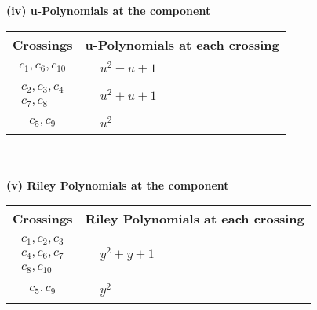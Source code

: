 \documentclass[1p]{elsarticle_modified}
\theoremstyle{definition}
\begin{document}
\newpage\renewcommand{\arraystretch}{1}
\flushleft \textbf{(iv) u-Polynomials at the component}\newline \\
\begin{tabular}{m{50pt}|m{274pt}}
Crossings & \hspace{64pt}u-Polynomials at each crossing \\
\hline $$\begin{aligned}c_{1},c_{6},c_{10}\end{aligned}$$&$\begin{aligned}
&u^2- u+1
\end{aligned}$\\
\hline $$\begin{aligned}c_{2},c_{3},c_{4}\\c_{7},c_{8}\end{aligned}$$&$\begin{aligned}
&u^2+u+1
\end{aligned}$\\
\hline $$\begin{aligned}c_{5},c_{9}\end{aligned}$$&$\begin{aligned}
&u^2
\end{aligned}$\\
\hline
\end{tabular}\\~\\
\newpage\renewcommand{\arraystretch}{1}
\flushleft \textbf{(v) Riley Polynomials at the component}\newline \\
\begin{tabular}{m{50pt}|m{274pt}}
Crossings & \hspace{64pt}Riley Polynomials at each crossing \\
\hline $$\begin{aligned}c_{1},c_{2},c_{3}\\c_{4},c_{6},c_{7}\\c_{8},c_{10}\end{aligned}$$&$\begin{aligned}
&y^2+y+1
\end{aligned}$\\
\hline $$\begin{aligned}c_{5},c_{9}\end{aligned}$$&$\begin{aligned}
&y^2
\end{aligned}$\\
\hline
\end{tabular}\\~\\
\end{document}
